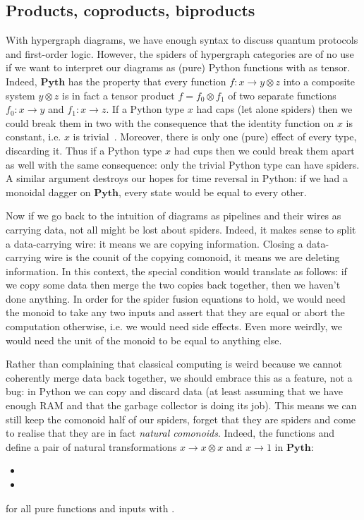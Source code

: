 
\subsection{Products, coproducts, biproducts}

With hypergraph diagrams, we have enough syntax to discuss quantum protocols and first-order logic.
However, the spiders of hypergraph categories are of no use if we want to interpret our diagrams as (pure) Python functions with  as tensor.
Indeed, $\mathbf{Pyth}$ has the property that every function $f : x \to y \otimes z$ into a composite system $y \otimes z$ is in fact a tensor product $f = f_0 \otimes f_1$ of two separate functions $f_0 : x \to y$ and $f_1 : x \to z$.
If a Python type $x$ had caps (let alone spiders) then we could break them in two with the consequence that the identity function on $x$ is constant, i.e. $x$ is trivial~\cite[?]{CoeckeKissinger17}.
Moreover, there is only one (pure) effect of every type, discarding it.
Thus if a Python type $x$ had cups then we could break them apart as well with the same consequence: only the trivial Python type can have spiders.
A similar argument destroys our hopes for time reversal in Python: if we had a monoidal dagger on $\mathbf{Pyth}$, every state would be equal to every other.

Now if we go back to the intuition of diagrams as pipelines and their wires as carrying data, not all might be lost about spiders.
Indeed, it makes sense to split a data-carrying wire: it means we are copying information.
Closing a data-carrying wire is the counit of the copying comonoid, it means we are deleting information.
In this context, the special condition would translate as follows: if we copy some data then merge the two copies back together, then we haven't done anything.
In order for the spider fusion equations to hold, we would need the monoid to take any two inputs and assert that they are equal or abort the computation otherwise, i.e. we would need side effects.
Even more weirdly, we would need the unit of the monoid to be equal to anything else.

Rather than complaining that classical computing is weird because we cannot coherently merge data back together, we should embrace this as a feature, not a bug: in Python we can copy and discard data (at least assuming that we have enough RAM and that the garbage collector is doing its job).
This means we can still keep the comonoid half of our spiders, forget that they are spiders and come to realise that they are in fact \emph{natural comonoids}.
Indeed, the functions  and  define a pair of natural transformations $x \to x \otimes x$ and $x \to 1$ in $\mathbf{Pyth}$:
\begin{itemize}
    \item {}
    \item {}
\end{itemize}
for all pure functions  and inputs  with .

